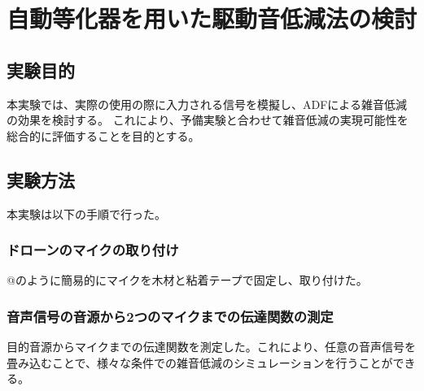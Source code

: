 \hypertarget{ux81eaux52d5ux7b49ux5316ux5668ux3092ux7528ux3044ux305fux99c6ux52d5ux97f3ux4f4eux6e1bux6cd5ux306eux691cux8a0e}{%
\section{自動等化器を用いた駆動音低減法の検討}\label{ux81eaux52d5ux7b49ux5316ux5668ux3092ux7528ux3044ux305fux99c6ux52d5ux97f3ux4f4eux6e1bux6cd5ux306eux691cux8a0e}}

\hypertarget{ux5b9fux9a13ux76eeux7684}{%
\subsection{実験目的}\label{ux5b9fux9a13ux76eeux7684}}

本実験では、実際の使用の際に入力される信号を模擬し、ADFによる雑音低減の効果を検討する。
これにより、予備実験と合わせて雑音低減の実現可能性を総合的に評価することを目的とする。

\hypertarget{ux5b9fux9a13ux65b9ux6cd5}{%
\subsection{実験方法}\label{ux5b9fux9a13ux65b9ux6cd5}}

本実験は以下の手順で行った。

\hypertarget{ux30c9ux30edux30fcux30f3ux306eux30deux30a4ux30afux306eux53d6ux308aux4ed8ux3051}{%
\subsubsection{ドローンのマイクの取り付け}\label{ux30c9ux30edux30fcux30f3ux306eux30deux30a4ux30afux306eux53d6ux308aux4ed8ux3051}}

@のように簡易的にマイクを木材と粘着テープで固定し、取り付けた。

\hypertarget{ux97f3ux58f0ux4fe1ux53f7ux306eux97f3ux6e90ux304bux30892ux3064ux306eux30deux30a4ux30afux307eux3067ux306eux4f1dux9054ux95a2ux6570ux306eux6e2cux5b9a}{%
\subsubsection{音声信号の音源から2つのマイクまでの伝達関数の測定}\label{ux97f3ux58f0ux4fe1ux53f7ux306eux97f3ux6e90ux304bux30892ux3064ux306eux30deux30a4ux30afux307eux3067ux306eux4f1dux9054ux95a2ux6570ux306eux6e2cux5b9a}}

目的音源からマイクまでの伝達関数を測定した。これにより、任意の音声信号を畳み込むことで、様々な条件での雑音低減のシミュレーションを行うことができる。

